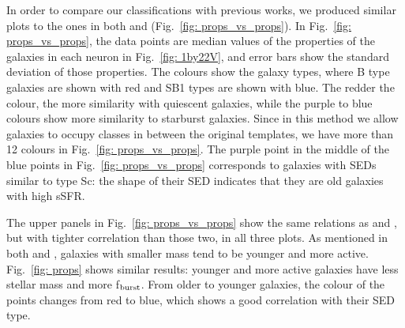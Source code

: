         In order to compare our classifications with previous works, we produced similar plots to the ones in both  and  (Fig.~\ref{fig: props_vs_props}).
        In Fig.~\ref{fig: props_vs_props}, the data points are median values of the properties of the galaxies in each neuron in Fig.~\ref{fig: 1by22V}, and error bars show the standard deviation of those properties.
        The colours show the galaxy types, where B type galaxies are shown with red and SB1 types are shown with blue.
        The redder the colour, the more similarity with  quiescent galaxies, while the purple to blue colours show more similarity to starburst galaxies.
        Since in this method we allow galaxies to occupy classes in between the original  templates, we have more than 12 colours in Fig.~\ref{fig: props_vs_props}.
        The purple point in the middle of the blue points in  Fig.~\ref{fig: props_vs_props} corresponds to galaxies with SEDs similar to type Sc: the shape of their SED indicates that they are old galaxies with high sSFR.
        
        The upper panels in Fig.~\ref{fig: props_vs_props} show the same relations as  and , but with tighter correlation than those two, in all three plots.
        As mentioned in both  and , galaxies with smaller mass tend to be younger and more active.
        Fig.~\ref{fig: props} shows similar results: younger and more active galaxies have less stellar mass and more f$_{\rm {burst}}$.
        From older to younger galaxies, the colour of the points changes from red to blue, which shows a good correlation with their SED type.
        
